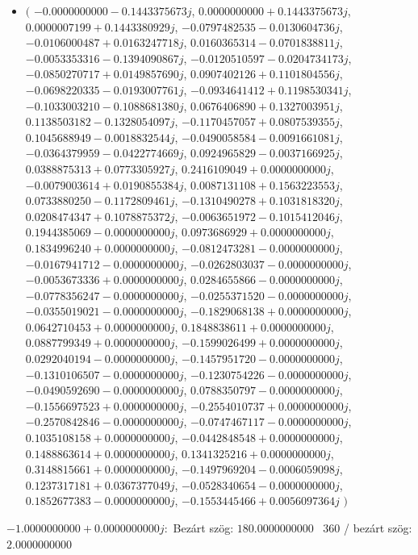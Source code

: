 \documentclass[14pt,a4paper]{article}
\begin{document}
\begin{itemize}
\item
$\big($
$-0.0000000000-0.1443375673j$, $0.0000000000+0.1443375673j$, $0.0000007199+0.1443380929j$, $-0.0797482535-0.0130604736j$, $-0.0106000487+0.0163247718j$, $0.0160365314-0.0701838811j$, $-0.0053353316-0.1394090867j$, $-0.0120510597-0.0204734173j$, $-0.0850270717+0.0149857690j$, $0.0907402126+0.1101804556j$, $-0.0698220335-0.0193007761j$, $-0.0934641412+0.1198530341j$, $-0.1033003210-0.1088681380j$, $0.0676406890+0.1327003951j$, $0.1138503182-0.1328054097j$, $-0.1170457057+0.0807539355j$, $0.1045688949-0.0018832544j$, $-0.0490058584-0.0091661081j$, $-0.0364379959-0.0422774669j$, $0.0924965829-0.0037166925j$, $0.0388875313+0.0773305927j$, $0.2416109049+0.0000000000j$, $-0.0079003614+0.0190855384j$, $0.0087131108+0.1563223553j$, $0.0733880250-0.1172809461j$, $-0.1310490278+0.1031818320j$, $0.0208474347+0.1078875372j$, $-0.0063651972-0.1015412046j$, $0.1944385069-0.0000000000j$, $0.0973686929+0.0000000000j$, $0.1834996240+0.0000000000j$, $-0.0812473281-0.0000000000j$, $-0.0167941712-0.0000000000j$, $-0.0262803037-0.0000000000j$, $-0.0053673336+0.0000000000j$, $0.0284655866-0.0000000000j$, $-0.0778356247-0.0000000000j$, $-0.0255371520-0.0000000000j$, $-0.0355019021-0.0000000000j$, $-0.1829068138+0.0000000000j$, $0.0642710453+0.0000000000j$, $0.1848838611+0.0000000000j$, $0.0887799349+0.0000000000j$, $-0.1599026499+0.0000000000j$, $0.0292040194-0.0000000000j$, $-0.1457951720-0.0000000000j$, $-0.1310106507-0.0000000000j$, $-0.1230754226-0.0000000000j$, $-0.0490592690-0.0000000000j$, $0.0788350797-0.0000000000j$, $-0.1556697523+0.0000000000j$, $-0.2554010737+0.0000000000j$, $-0.2570842846-0.0000000000j$, $-0.0747467117-0.0000000000j$, $0.1035108158+0.0000000000j$, $-0.0442848548+0.0000000000j$, $0.1488863614+0.0000000000j$, $0.1341325216+0.0000000000j$, $0.3148815661+0.0000000000j$, $-0.1497969204-0.0006059098j$, $0.1237317181+0.0367377049j$, $-0.0528340654-0.0000000000j$, $0.1852677383-0.0000000000j$, $-0.1553445466+0.0056097364j$
$\big)$
\end{itemize}
$-1.0000000000+0.0000000000j$:\
Bezárt szög: $180.0000000000$ \
360 / bezárt szög: $2.0000000000$\
\end{document}
